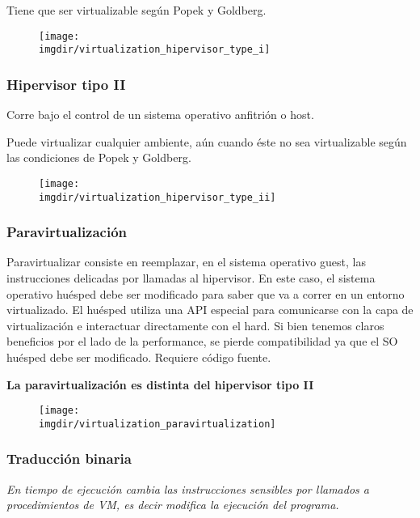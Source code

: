 \documentclass[a4paper, twoside]{article}
\newcommand{\imgdir}{../resources/images} %
\begin{document}
Tiene que ser virtualizable según Popek y Goldberg.

\begin{figure}[h]
	\centering
	\texttt{[image: \\imgdir/virtualization\_hipervisor\_type\_i]}
\end{figure}

\subsubsection{Hipervisor tipo II}
Corre bajo el control de un sistema operativo anfitrión o host. 

Puede virtualizar cualquier ambiente, aún cuando éste no sea virtualizable según las condiciones de Popek y Goldberg.

\begin{figure}[h]
	\centering
	\texttt{[image: \\imgdir/virtualization\_hipervisor\_type\_ii]}
	\label{fig:virtualizacion_hipervisor_tipo_ii}
\end{figure}

\subsubsection{Paravirtualización}
Paravirtualizar consiste en reemplazar, en el sistema operativo guest, las instrucciones delicadas por llamadas al hipervisor. En este caso, el sistema operativo huésped debe ser modificado para saber que va a correr en un entorno virtualizado. El huésped utiliza una API especial para comunicarse con la capa de virtualización e interactuar directamente con el hard. Si bien tenemos claros beneficios por el lado de la performance, se pierde compatibilidad ya que el SO huésped debe ser modificado. Requiere código fuente.

\textbf{La paravirtualización es distinta del hipervisor tipo II}

\begin{figure}[h]
	\centering
	\texttt{[image: \\imgdir/virtualization\_paravirtualization]}
	\label{fig:virtualizacion_paravirtualization}
\end{figure}

\subsubsection{Traducción binaria}
\textit{En tiempo de ejecución cambia las instrucciones sensibles por llamados a procedimientos de VM, es decir modifica la ejecución del programa.}\\
\end{document}
